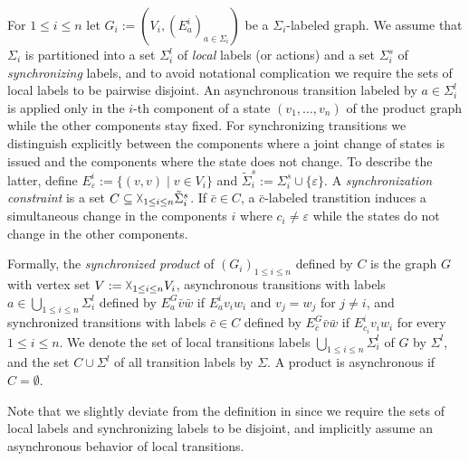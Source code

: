 \documentclass{LMCS}
\renewcommand{\epsilon}{\varepsilon}
\begin{document}
For $ 1 \le i \le n$ let $G_i:=(V_i,(E_a^i)_{a \in \Sigma_i})$ be a 
$\Sigma_i$-labeled graph. We assume that $\Sigma_i$ is partitioned into
a set $\Sigma_i^l$ of \emph{local} labels (or actions) and a set $\Sigma_i^s$ of
\emph{synchronizing} labels, and to avoid notational complication we require 
the sets of local labels to be pairwise disjoint. An asynchronous transition 
labeled by $a \in \Sigma_i^l$ is applied only in the $i$-th component of a
state $(v_1,\ldots,v_n)$ of the product graph while the other components stay 
fixed. For synchronizing transitions we distinguish explicitly between the 
components where a joint change of states is issued and the components where the 
state does not change. To describe the latter, define
$E_\epsilon^i:=\{(v,v) \mid v \in V_i\}$ and $\tilde\Sigma_i^s:=\Sigma_i^s \cup 
\{\epsilon\}$. A \emph{synchronization constraint} is a set $C \subseteq 
\vartimes_{1 \le i \le n} \tilde\Sigma_i^s$. If $\bar c \in C$, a $\bar c$-labeled 
transtition induces a simultaneous change in the components $i$ where $c_i \neq \epsilon$
while the states do not change in the other components.

Formally, the \emph{synchronized product} of $(G_i)_{1 \le i \le n}$ defined
by $C$ is the graph $G$ with vertex set $V:=\vartimes_{1 \le i \le n} V_i$, 
asynchronous transitions with labels $a \in \bigcup_{1 \le i \le n} \Sigma_i^l$
defined by $E_a^G \bar v \bar w$ if $E_a^i v_i w_i$ and
$v_j=w_j$ for $j \neq i$, and synchronized transitions with labels $\bar c \in 
C$ defined by $E_{\bar c}^G \bar v \bar w$ if $E_{c_i}^i v_i w_i$ for every $1 \le i \le n$.
We denote the set of local transitions labels $\bigcup_{1 \le i \le n} \Sigma_i^l$ of $G$ 
by $\Sigma^l$, and the set $C \cup \Sigma^l$ of all transition labels by $\Sigma$.
A product is asynchronous if $C=\emptyset$.

Note that we slightly deviate from the definition in \cite{arn94} 
since we require the sets of local labels and synchronizing labels to be 
disjoint, and implicitly assume an asynchronous behavior of local transitions.
 
\end{document}
